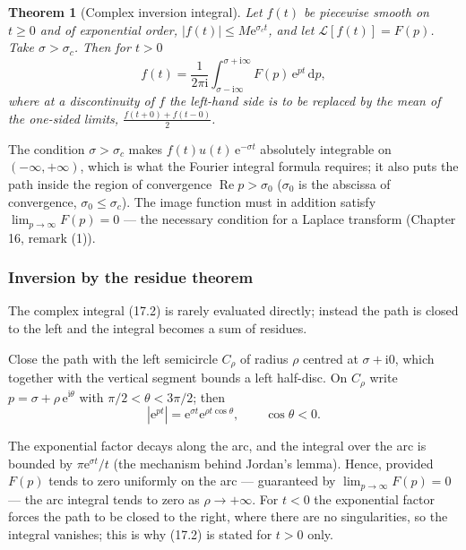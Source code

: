 \documentclass[11pt,a4paper]{article}
\theoremstyle{definition}
\theoremstyle{plain}
\newtheorem{theorem}{Theorem}[section]
\begin{document}
\begin{theorem}[Complex inversion integral]
Let $f(t)$ be piecewise smooth on $t\ge 0$ and of exponential order,
$\left|f(t)\right|\le M\mathrm{e}^{\sigma_c t}$, and let
$\mathcal{L}\left[f(t)\right]=F(p)$. Take $\sigma>\sigma_c$. Then for $t>0$
\begin{equation}
f(t)=\frac{1}{2\pi\mathrm{i}}\int_{\sigma-\mathrm{i}\infty}^{\sigma+\mathrm{i}\infty}
F(p)\,\mathrm{e}^{pt}\,\mathrm{d}p , \tag{17.2}
\end{equation}
where at a discontinuity of $f$ the left-hand side is to be replaced by the mean of the one-sided
limits, $\frac{f(t+0)+f(t-0)}{2}$.
\end{theorem}

The condition $\sigma>\sigma_c$ makes $f(t)u(t)\,\mathrm{e}^{-\sigma t}$ absolutely integrable on
$(-\infty,+\infty)$, which is what the Fourier integral formula requires; it also puts the path
inside the region of convergence $\operatorname{Re}p>\sigma_0$ ($\sigma_0$ is the abscissa of
convergence, $\sigma_0\le\sigma_c$). The image function must in addition satisfy
$\lim_{p\to\infty}F(p)=0$ --- the necessary condition for a Laplace transform (Chapter 16,
remark (1)).

\subsubsection{Inversion by the residue theorem}

The complex integral (17.2) is rarely evaluated directly; instead the path is closed to the left and
the integral becomes a sum of residues.

Close the path with the left semicircle $C_{\rho}$ of radius $\rho$ centred at
$\sigma+\mathrm{i}0$, which together with the vertical segment bounds a left half-disc. On
$C_{\rho}$ write $p=\sigma+\rho\,\mathrm{e}^{\mathrm{i}\theta}$ with
$\pi/2<\theta<3\pi/2$; then
\begin{equation*}
\left|\mathrm{e}^{pt}\right|=\mathrm{e}^{\sigma t}\mathrm{e}^{\rho t\cos\theta},
\qquad \cos\theta<0 .
\end{equation*}

The exponential factor decays along the arc, and the integral over the arc is bounded by
$\pi\mathrm{e}^{\sigma t}/t$ (the mechanism behind Jordan's lemma). Hence, provided
$F(p)$ tends to zero uniformly on the arc --- guaranteed by $\lim_{p\to\infty}F(p)=0$ --- the arc
integral tends to zero as $\rho\to+\infty$. For $t<0$ the exponential factor forces the path to be
closed to the right, where there are no singularities, so the integral vanishes; this is why (17.2)
is stated for $t>0$ only.
\end{document}
